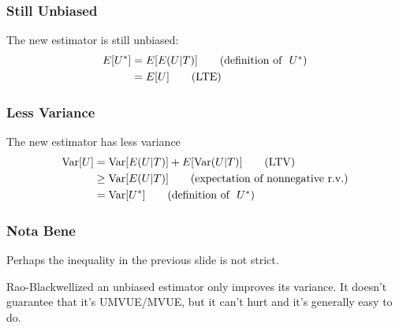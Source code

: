 \documentclass{beamer}
\begin{document}
\begin{frame}
\frametitle{Still Unbiased}

The new estimator is still unbiased:
\begin{align}
E[U^*] &= E[E(U|T)] \tag{\text{definition of } $U^*$} \\
&= E[U] \tag{\text{LTE}}
\end{align}

\end{frame}

\begin{frame}
\frametitle{Less Variance}

The new estimator has less variance
\begin{align}
\operatorname{Var}[U] &= \operatorname{Var}[E(U|T)] + E[\operatorname{Var}(U|T)] \tag{\text{LTV}} \\
&\ge \operatorname{Var}[E(U|T)] \tag{\text{expectation of nonnegative r.v.}} \\
&=  \operatorname{Var}[U^*] \tag{\text{definition of } $U^*$}
\end{align}

\end{frame}

\begin{frame}
\frametitle{Nota Bene}

Perhaps the inequality in the previous slide is not strict.
\newline

Rao-Blackwellized an unbiased estimator only improves its variance. It doesn't guarantee that it's UMVUE/MVUE, but it can't hurt and it's generally easy to do.


\end{frame}
\end{document}
